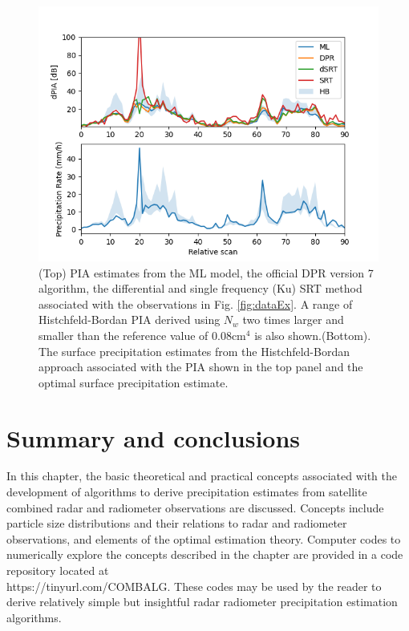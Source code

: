 \documentclass[10pt]{ietbook}
\begin{document}
\begin{figure}\label{fig:retrievals}
    \centerline{}
    \includegraphics[width=\textwidth]{retPIA.png}
    
    \caption{(Top) PIA estimates from the ML model, the official DPR version 7 algorithm, the differential and single frequency (Ku)
    SRT method associated with the observations in Fig. \ref{fig:dataEx}.  A range of Histchfeld-Bordan PIA derived using $N_w$ two times larger and smaller 
    than the reference value of 0.08cm$^4$ is also
    shown.(Bottom). The surface precipitation estimates from the Histchfeld-Bordan approach associated with the PIA shown in the top panel
    and the optimal surface precipitation estimate.}
\end{figure}

\section{Summary and conclusions}

In this chapter, the basic theoretical and practical concepts associated with the development of algorithms to derive precipitation estimates 
from satellite combined radar and radiometer observations are discussed. Concepts include  particle size distributions and their relations to radar
and radiometer observations,
and elements of the optimal estimation theory.  Computer codes to numerically explore the concepts described in the chapter are provided in a
code repository located at \\https://tinyurl.com/COMBALG. These codes
may be used by the reader to derive relatively simple but insightful radar radiometer precipitation estimation algorithms.  
\end{document}
